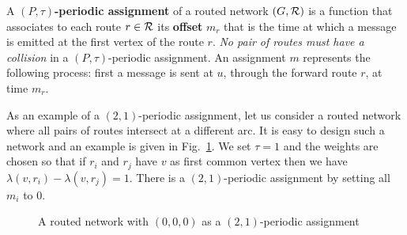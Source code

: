 \documentclass[10pt, conference, letterpaper]{IEEEtran}
\begin{document}
         A {\bf $(P,\tau)$-periodic assignment} of a routed network $(G,\cal R)$ is a function that associates to each route 
         $r \in \cal R$ its \textbf{offset} $m_r$ that is the time at which a message is emitted at the first vertex of the route $r$. \emph{No pair of routes must have a collision} in a $(P,\tau)$-periodic assignment.
	 An assignment $m$ represents the following process: first a message is sent at $u$, through the forward route $r$, at time $m_r$.
	 
      As an example of a $(2,1)$-periodic assignment, let us consider a routed network 
      where all pairs of routes intersect at a different arc. It is easy to design such a network and an example is given in Fig.~\ref{fig:example}. We set $\tau = 1$ and the weights are chosen so that if $r_{i}$ and $r_{j}$ have $v$ as first common vertex then we have $\lambda(v,r_{i}) - \lambda(v,r_{j})=1$. There is a $(2,1)$-periodic assignment by setting all $m_{i}$ to $0$.

  
      \begin{figure}[ht]
      \begin{center}
     \end{center}
       \caption{A routed network with $(0,0,0)$ as a $(2,1)$-periodic assignment}
       \label{fig:example}
      \end{figure}
\end{document}

